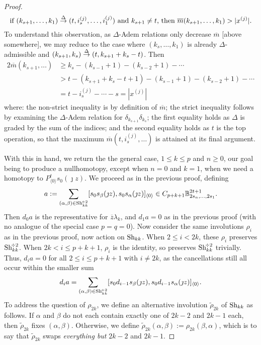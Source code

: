 \documentclass[11pt]{amsart}
\theoremstyle{plain}
\theoremstyle{definition}
\theoremstyle{plain}
\newcommand{\deltaalg}{\Delta} %
\newcommand{\minDimP}{\overline{m}}
\newcommand{\produces}[3]{#3:#1\sim #2}
\renewcommand{\produces}[3]{#1\rightarrow_{#3} #2}%
\renewcommand{\produces}[3]{#1\overset{\smash{#3}}{\rightarrow} #2}%
\newcommand{\Shuffles}[2]{\textup{Sh}_{#1#2}}
\newcommand{\HalfShuffles}[2]{\textup{Sh}_{#1#2}^{\smash{\!\div2}}}
\begin{document}
\begin{Koszul complexes}
\begin{proof}
\[\textup{if }\produces{(k_{s+1},\ldots,k_1)}{(t,i_{s}^{(j)},\ldots,i_1^{(j)})}{\deltaalg}\textup{ and }k_{s+1}\neq t\textup{, then }\minDimP(k_{s+1},\ldots,k_1)>|x^{(j)}|.\]
To understand this observation, as $\deltaalg$-Adem relations only decrease $\minDimP$ [above somewhere], we may reduce to the case where $(k_s,\ldots,k_1)$ is already $\deltaalg$-admissible and $\produces{(k_{s+1},k_{s})}{(t,k_{s+1}+k_{s}-t)}{\deltaalg}$. Then
\begin{alignat*}{2}
\minDimP(k_{s+1},\ldots)&\geq k_{s}-(k_{s-1}+1)-(k_{s-2}+1)-\cdots  \\
&> t-(k_{s+1}+k_s-t+1)-(k_{s-1}+1)-(k_{s-2}+1)-\cdots  \\
&=t-i^{(j)}_{s}-\cdots -s=|x^{(j)}|
\end{alignat*}
where: the non-strict inequality is by definition of $\minDimP$; the strict inequality follows by examining the $\deltaalg$-Adem relation for $\delta_{k_{s+1}}\delta_{k_{s}}$; the first equality holds as $\deltaalg$ is graded by the sum of the indices; and the second equality holds as $t$ is the top operation, so that the maximum $\minDimP(t,i^{(j)}_{s},\ldots)$ is attained at its final argument.

With this in hand, we return the the general case, $1\leq k\leq p$ and $n\geq0$, our goal being to produce a nullhomotopy, except when $n=0$ and $k=1$, when we need a homotopy to $P^t_{\langle 0\rangle}s_0(\jmath z)$. We proceed as in the previous proof, defining
\[a:=\sum_{(\alpha,\beta)\in\HalfShuffles{k}{k}}[s_{0}s_\beta(\jmath z), s_{0}s_\alpha(\jmath z)]_{\langle 0\rangle}\in C_{p+k+1}\mathbb{B}_{2s_n,\ldots,2s_1}^{2t+1}.\]
Then $d_0a$ is the representative for $\overline{z}\lambda_k$, and $d_1a=0$ as in the previous proof (with no analogue of the special case $p=q=0$). Now consider the same involutions $\rho_i$ as in the previous proof, now action on $\Shuffles{k}{k}$. When $2\leq i< 2k$, these $\rho_i$ preserves $\HalfShuffles{k}{k}$. When $2k<i\leq p+k+1$, $\rho_i$ is the identity, so preserves $\HalfShuffles{k}{k}$ trivially. Thus, $d_ia=0$ for all $2\leq i\leq p+k+1$ with $i\neq2k$, as  the cancellations still all occur within the smaller sum
\[d_{i}a=\sum_{(\alpha,\beta)\in\HalfShuffles{k}{k}} [s_{0}d_{i-1}s_\beta(\jmath z), s_{0}d_{i-1}s_\alpha(\jmath z)]_{\langle 0\rangle}.\]
To address the question of $\rho_{2k}$, we define an alternative involution $\widetilde{\rho}_{2k}$ of $\Shuffles{k}{k}$ as follows.  If $\alpha$ and $\beta$ do not each contain exactly one of $2k-2$ and $2k-1$ each, then $\widetilde{\rho}_{2k}$ fixes $(\alpha,\beta)$. Otherwise, we define $\widetilde{\rho}_{2k}(\alpha,\beta):=\rho_{2k}(\beta,\alpha)$, which is to say that $\widetilde{\rho}_{2k}$ swaps \emph{everything but} $2k-2$ and $2k-1$.


\end{proof}
\end{Koszul complexes}
\end{document}
